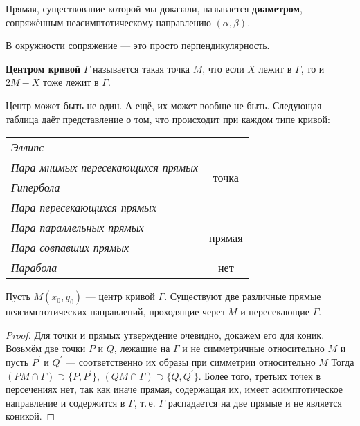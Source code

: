 \begin{definition}
    Прямая, существование которой мы доказали, называется \textbf{диаметром}, сопряжённым неасимптотическому направлению $(\alpha, \beta)$.
\end{definition}

\begin{remark}
    В окружности сопряжение --- это просто перпендикулярность.
\end{remark}

\begin{definition}
    \textbf{Центром кривой} $\Gamma$ называется такая точка $M$, что если $X$ лежит в $\Gamma$, то и $2M - X$ тоже лежит в $\Gamma$.
\end{definition}

\begin{remark}
    Центр может быть не один. А ещё, их может вообще не быть. Следующая таблица даёт представление о том, что происходит при каждом типе кривой:
    \begin{center}
        \begin{tabular}{| l | c |}
            \hline
            \textit{Эллипс} & \multirow{4}{*}{точка}\\
            \textit{Пара мнимых пересекающихся прямых} & \\
            \textit{Гипербола} & \\
            \textit{Пара пересекающихся прямых} & \\
            \hline
            \textit{Пара параллельных прямых} & \multirow{2}{*}{прямая}\\
            \textit{Пара совпавших прямых} & \\
            \hline
            \textit{Парабола} & нет\\
            \hline
        \end{tabular}
    \end{center}
\end{remark}

\begin{lemma}
    Пусть $M(x_0, y_0)$ --- центр кривой $\Gamma$. Существуют две различные прямые неасимптотических направлений, проходящие через $M$ и пересекающие $\Gamma$.
\end{lemma}

\begin{proof}
    Для точки и прямых утверждение очевидно, докажем его для коник. Возьмём две точки $P$ и $Q$, лежащие на $\Gamma$ и не симметричные относительно $M$ и пусть $P^\prime$ и $Q^\prime$ --- соответственно их образы при симметрии относительно $M$ Тогда $(PM \cap \Gamma) \supset\{P, P^\prime\}$, $(QM \cap \Gamma) \supset \{Q, Q^\prime\}$. Более того, третьих точек в персечениях нет, так как иначе прямая, содержащая их, имеет асимптотическое направление и содержится в $\Gamma$, т.\,е. $\Gamma$ распадается на две прямые и не является коникой.
\end{proof}

